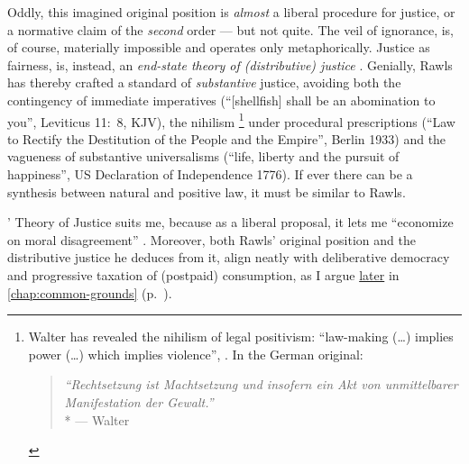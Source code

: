 Oddly, this imagined original position is \emph{almost} a liberal procedure for justice, or a normative claim of the \emph{second} order --- but not quite.
The veil of ignorance, is, of course, materially impossible and operates only metaphorically.
Justice as fairness, is, instead, an \emph{end-state theory of (distributive) justice} \citep[1007]{Fried1999}.
Genially, Rawls has thereby crafted a standard of \emph{substantive} justice, avoiding both the contingency of immediate imperatives (``[shellfish] shall be an abomination to you'', Leviticus 11:~8, KJV), the nihilism
\footnote{
	Walter \citeauthor{Benjamin1927} has revealed the nihilism of legal positivism:
	``law-making (\ldots) implies power (\ldots) which implies violence'', \citep[12, own translation]{Benjamin1927}.
	In the German original:
		\begin{quote}
			\emph{``Rechtsetzung ist Machtsetzung und insofern ein Akt von unmittelbarer Manifestation der Gewalt.''}
			\\*
			--- Walter \citet[12]{Benjamin1927}
		\end{quote}
}
under procedural prescriptions (``Law to Rectify the Destitution of the People and the Empire'', Berlin 1933) and the vagueness of substantive universalisms (``life, liberty and the pursuit of happiness'', US Declaration of Independence 1776).
If ever there can be a synthesis between natural and positive law, it must be similar to Rawls.

\citeauthor{Rawls-1971}' Theory of Justice suits me, because as a liberal proposal, it lets me ``economize on moral disagreement'' \citep[K226]{GutmannThompson-2004-aa}.
Moreover, both Rawls' original position and the distributive justice he deduces from it, align neatly with deliberative democracy and progressive taxation of (postpaid) consumption, as I argue \hyperref[chap:common-grounds]{later} in \autoref{chap:common-grounds} (p.~\pageref{chap:common-grounds}).


